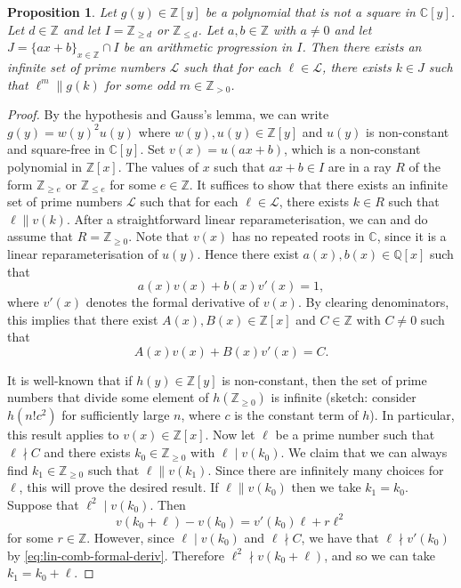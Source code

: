 \documentclass[12pt]{amsart}
\theoremstyle{plain}
\newtheorem{prop}[theorem]{Proposition}
\theoremstyle{remark}
\theoremstyle{definition}
\newcommand{\Z}{\mathbb{Z}}
\newcommand{\Q}{\mathbb{Q}}
\newcommand{\C}{\mathbb{C}}
\numberwithin{equation}{section}
\begin{document}
\begin{prop}\label{prop:infinitepol}
Let $g(y)\in\Z[y]$ be a polynomial that is not a square in $\C[y]$. 
Let $d \in \Z$ and let $I=\Z_{\geq d}$ or $\Z_{\leq d}$.
Let $a,b \in \Z$ with $a \neq 0$ and let $J=\{ ax+b \}_{x \in \Z} \cap I$ be an arithmetic progression in $I$.
Then there exists an infinite set of prime numbers $\mathcal L$ such that for each $\ell \in\mathcal L$, 
there exists $k \in J$ such that $\ell^{m} \parallel g(k)$ for some odd $m \in \Z_{>0}$.
\end{prop}

\begin{proof}
By the hypothesis and Gauss's lemma, we can write $g(y)=w(y)^{2}u(y)$ where $w(y),u(y) \in \Z[y]$ and
$u(y)$ is non-constant and square-free in $\C[y]$.
Set $v(x)=u(ax+b)$, which is a non-constant polynomial in $\Z[x]$. 
The values of $x$ such that $ax+b\in I$ are in a ray $R$ of the form $\Z_{\geq e}$ or $\Z_{\leq e}$ for some
$e \in \Z$.
It suffices to show that there exists an infinite set of prime numbers $\mathcal{L}$ such that for each
$\ell \in \mathcal{L}$, there exists $k \in R$ such that $\ell \parallel v(k)$.
After a straightforward linear reparameterisation, we can and do assume that $R=\Z_{\geq 0}$. 
Note that $v(x)$ has no repeated roots in $\C$, since it is a linear reparameterisation of $u(y)$.
Hence there exist $a(x),b(x)\in \Q[x]$ such that
\[
 a(x)v(x)+b(x)v'(x)=1,
\]
where $v'(x)$ denotes the formal derivative of $v(x)$. 
By clearing denominators, this implies that there exist $A(x),B(x) \in \Z[x]$ and $C \in \Z$ with $C \neq 0$
such that 
\begin{equation}\label{eq:lin-comb-formal-deriv}
A(x)v(x)+B(x)v'(x)=C. 
\end{equation}

It is well-known that if $h(y) \in \Z[y]$ is non-constant, 
then the set of prime numbers that divide some element of $h(\Z_{\geq 0})$ is infinite 
(sketch: consider $h(n!c^2)$ for sufficiently large $n$, where $c$ is the constant term of $h$).
In particular, this result applies to $v(x) \in \Z[x]$.
Now let $\ell$ be a prime number such that $\ell \nmid C$ and there exists $k_{0} \in \Z_{\geq 0}$ with 
$\ell\mid v(k_{0})$. 
We claim that we can always find $k_{1} \in \Z_{\geq 0}$ such that $\ell \parallel v(k_{1})$. 
Since there are infinitely many choices for $\ell$, this will prove the desired result.
If $\ell \parallel v(k_{0})$ then we take $k_{1}=k_{0}$.
Suppose that $\ell^{2} \mid v(k_{0})$. Then
\[
 v(k_{0}+\ell)-v(k_{0})=v'(k_{0})\ell+r\ell^{2}
\]
for some $r \in \Z$.
However, since $\ell\mid v(k_{0})$ and $\ell\nmid C$, we have that $\ell\nmid v'(k_{0})$ by 
\eqref{eq:lin-comb-formal-deriv}. 
Therefore $\ell^{2} \nmid v(k_{0}+\ell)$, and so we can take $k_{1}=k_{0}+\ell$.
\end{proof}
\end{document}
